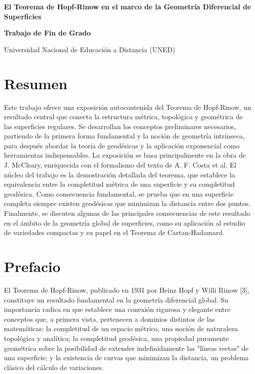 \documentclass[12pt, a4paper]{report}
\theoremstyle{miestilo}
\theoremstyle{midefinicion}
\begin{document}
\onehalfspacing

\begin{titlepage}
    \centering
    \vspace*{1cm}
    {\Huge\bfseries\color{DarkRed} El Teorema de Hopf-Rinow en el marco de la Geometría Diferencial de Superficies}
    \vfill
    \begin{center}
        \Large\textbf{Trabajo de Fin de Grado}
    \end{center}
    \vfill
    {\large Universidad Nacional de Educación a Distancia (UNED)}
    \vspace{2cm}
\end{titlepage}

\chapter*{Resumen}

\noindent Este trabajo ofrece una exposición autocontenida del Teorema de Hopf-Rinow, un resultado central que conecta la estructura métrica, topológica y geométrica de las superficies regulares. Se desarrollan los conceptos preliminares necesarios, partiendo de la primera forma fundamental y la noción de geometría intrínseca, para después abordar la teoría de geodésicas y la aplicación exponencial como herramientas indispensables. La exposición se basa principalmente en la obra de J. McCleary, enriquecida con el formalismo del texto de A. F. Costa et al. El núcleo del trabajo es la demostración detallada del teorema, que establece la equivalencia entre la completitud métrica de una superficie y su completitud geodésica. Como consecuencia fundamental, se prueba que en una superficie completa siempre existen geodésicas que minimizan la distancia entre dos puntos. Finalmente, se discuten algunas de las principales consecuencias de este resultado en el ámbito de la geometría global de superficies, como su aplicación al estudio de variedades compactas y su papel en el Teorema de Cartan-Hadamard.

\tableofcontents

\chapter*{Prefacio}

El Teorema de Hopf-Rinow, publicado en 1931 por Heinz Hopf y Willi Rinow [3], constituye un resultado fundamental en la geometría diferencial global. Su importancia radica en que establece una conexión rigurosa y elegante entre conceptos que, a primera vista, pertenecen a dominios distintos de las matemáticas: la completitud de un espacio métrico, una noción de naturaleza topológica y analítica; la completitud geodésica, una propiedad puramente geométrica sobre la posibilidad de extender indefinidamente las "líneas rectas" de una superficie; y la existencia de curvas que minimizan la distancia, un problema clásico del cálculo de variaciones.
\end{document}
